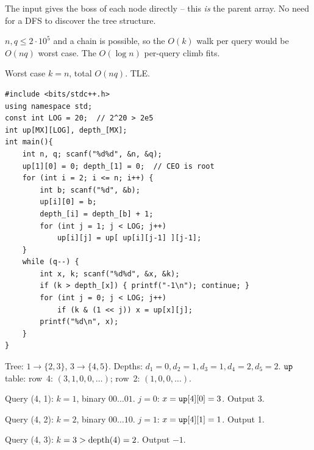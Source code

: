 \begin{observation}
The input gives the boss of each node directly -- this \emph{is} the
parent array.  No need for a DFS to discover the tree structure.
\end{observation}
\begin{observation}
\(n, q \le 2\cdot10^5\) and a chain is possible, so the \(O(k)\) walk
per query would be \(O(nq)\) worst case.  The \(O(\log n)\) per-query
climb fits.
\end{observation}

\begin{thinkbox}
{Worst case \(k = n\), total \(O(nq)\).  TLE.}
\end{thinkbox}

\begin{lstlisting}[caption={CSES 1687 full solution (binary lifting)}, label={lst:c11-1687-soln}]
#include <bits/stdc++.h>
using namespace std;
const int LOG = 20;  // 2^20 > 2e5
int up[MX][LOG], depth_[MX];
int main(){
    int n, q; scanf("%d%d", &n, &q);
    up[1][0] = 0; depth_[1] = 0;  // CEO is root
    for (int i = 2; i <= n; i++) {
        int b; scanf("%d", &b);
        up[i][0] = b;
        depth_[i] = depth_[b] + 1;
        for (int j = 1; j < LOG; j++)
            up[i][j] = up[ up[i][j-1] ][j-1];
    }
    while (q--) {
        int x, k; scanf("%d%d", &x, &k);
        if (k > depth_[x]) { printf("-1\n"); continue; }
        for (int j = 0; j < LOG; j++)
            if (k & (1 << j)) x = up[x][j];
        printf("%d\n", x);
    }
}
\end{lstlisting}

\begin{tracebox}
Tree: \(1\to\{2,3\}\), \(3\to\{4,5\}\).  Depths: \(d_1=0, d_2=1, d_3=1, d_4=2, d_5=2\).
\(\texttt{up}\) table: row~4: \((3, 1, 0, 0, \dots)\); row~2: \((1, 0, 0, \dots)\).

Query (4, 1): \(k=1\), binary \(00\ldots01\).  \(j\!=\!0\): \(x = \texttt{up}[4][0] = 3\).
Output 3.  \checkmark

Query (4, 2): \(k=2\), binary \(00\ldots10\).  \(j\!=\!1\): \(x = \texttt{up}[4][1] = 1\).
Output 1.  \checkmark

Query (4, 3): \(k=3 > \operatorname{depth}(4)=2\).  Output \(-1\).  \checkmark
\end{tracebox}

